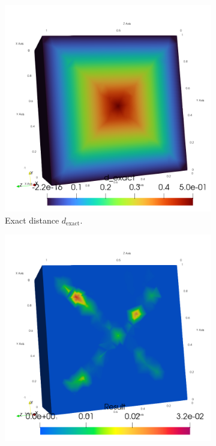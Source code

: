\begin{figure}
    \begin{subfigure}{0.33\textwidth}
        \centering
        \includegraphics[width=\columnwidth]{graphics/feelpp/feelpp-benchmark-distance-exact}
        \caption{Exact distance $d_\mathrm{exact}$.}
        \label{fig:specs:app-feelpp-distance:results:distance}
    \end{subfigure}
    \begin{subfigure}{0.33\textwidth}
        \centering
        \includegraphics[width=\columnwidth]{graphics/feelpp/feelpp-benchmark-distance-errorFMM}

\end{subfigure}
\end{figure}
